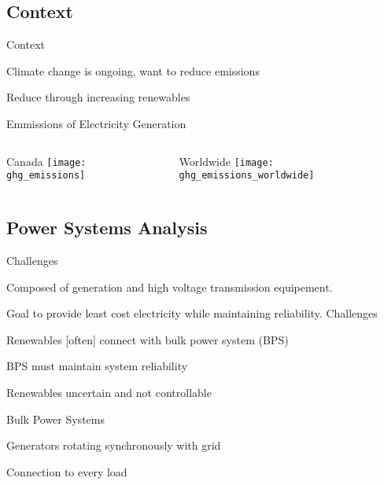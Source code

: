 \subsection{Context}
\begin{frame}{Context}
\bi
\item Climate change is ongoing, want to reduce emissions
\item Reduce through increasing renewables
\ei

\pause
\centering
\vspace{.2in}
\alert{Emmissions of Electricity Generation}
\vspace{.2in}
\begin{columns}
\begin{column}{0.425\textwidth}
\centering
Canada
\texttt{[image: ghg\_emissions]}
\end{column}
\begin{column}{0.425\textwidth}
\centering
Worldwide
\texttt{[image: ghg\_emissions\_worldwide]}
\end{column}
\end{columns}
\end{frame}

\subsection{Power Systems Analysis}
\begin{frame}{Challenges}


\bi
\item Composed of generation and high voltage transmission equipement.  
\item Goal to provide least cost electricity while maintaining reliability.
\ei
\EBR
\pause
\vspace{.3in}
\alert{Challenges}
\bi
\item Renewables [often] connect with bulk power system (BPS)
\item BPS must maintain system reliability
\item Renewables uncertain and not controllable
\ei
\end{frame}

\begin{frame}{Bulk Power Systems}


\bi
\item Generators rotating synchronously with grid
\item Connection to every load
\ei



\end{frame}

